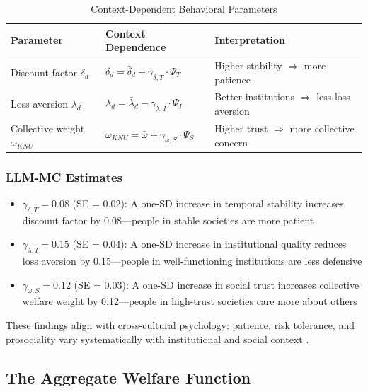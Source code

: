 \begin{table}[htbp]
\centering
\caption{Context-Dependent Behavioral Parameters}
\label{tab:context-params}
\renewcommand{\arraystretch}{1.3}
\begin{tabular}{@{}lll@{}}
\toprule
\textbf{Parameter} & \textbf{Context Dependence} & \textbf{Interpretation} \\
\midrule
Discount factor $\delta_d$ & $\delta_d = \bar{\delta}_d + \gamma_{\delta,T} \cdot \Psi_T$ & Higher stability $\Rightarrow$ more patience \\
Loss aversion $\lambda_d$ & $\lambda_d = \bar{\lambda}_d - \gamma_{\lambda,I} \cdot \Psi_I$ & Better institutions $\Rightarrow$ less loss aversion \\
Collective weight $\omega_{KNU}$ & $\omega_{KNU} = \bar{\omega} + \gamma_{\omega,S} \cdot \Psi_S$ & Higher trust $\Rightarrow$ more collective concern \\
\bottomrule
\end{tabular}
\end{table}

\subsubsection{LLM-MC Estimates}

\begin{itemize}
  \item $\gamma_{\delta,T} = 0.08$ (SE = 0.02): A one-SD increase in temporal stability increases discount factor by 0.08---people in stable societies are more patient
  \item $\gamma_{\lambda,I} = 0.15$ (SE = 0.04): A one-SD increase in institutional quality reduces loss aversion by 0.15---people in well-functioning institutions are less defensive
  \item $\gamma_{\omega,S} = 0.12$ (SE = 0.03): A one-SD increase in social trust increases collective welfare weight by 0.12---people in high-trust societies care more about others
\end{itemize}

These findings align with cross-cultural psychology: patience, risk tolerance, and prosociality
vary systematically with institutional and social context \citep{enke2019globalpref}.

\subsection{The Aggregate Welfare Function}

